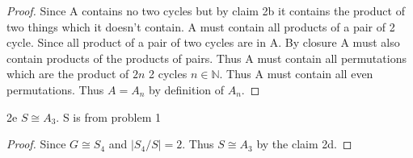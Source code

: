 \documentclass{article}
\newcommand{\N}{\mathbb{N}}
\begin{document}
\begin{proof}
    Since A contains no two cycles but by claim 2b it contains the product of two things which it doesn't contain. A must contain all products of a pair of 2 cycle. Since all product of a pair of two cycles are in A. By closure A must also contain products of the products of pairs. Thus A must contain all permutations which are the product of $2n$ 2 cycles $n \in \N$. Thus A must contain all even permutations. Thus $A = A_n$ by definition of $A_n$. 
\end{proof}
\begin{claim}{2e}
    $S \cong A_3$. S is from problem 1
\end{claim}
\begin{proof}
    Since $G \cong S_4$ and $|S_4/S| = 2$. Thus $S \cong A_3$ by the claim 2d.
\end{proof}

\bigskip
\end{document}
